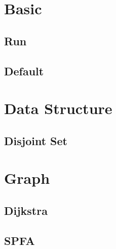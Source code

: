 \section{Basic}
    \subsection{Run}
        
    \subsection{Default}
        
    
\section{Data Structure}
    \subsection{Disjoint Set}
        

\section{Graph}
    \subsection{Dijkstra}
        
    \subsection{SPFA}
        